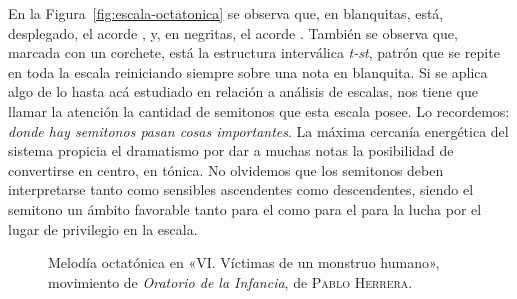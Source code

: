\documentclass[a4paper,10pt]{article}
\begin{document}
\begin{multicols}{2}
En la Figura~\ref{fig:escala-octatonica} se observa que, en blanquitas, está, desplegado, el acorde , y, en negritas, el acorde \hbox{.} También se observa que, marcada con un corchete, está la estructura interválica \emph{t-st}, patrón que se repite en toda la escala reiniciando siempre sobre una nota en blanquita. Si se aplica algo de lo hasta acá estudiado en relación a análisis de escalas, nos tiene que llamar la atención la cantidad de semitonos que esta escala posee. Lo recordemos: \emph{donde hay semitonos pasan cosas importantes}. La máxima cercanía energética del sistema propicia el dramatismo por dar a muchas notas la posibilidad de convertirse en centro, en tónica. No olvidemos que los semitonos deben interpretarse tanto como sensibles ascendentes como descendentes, siendo el semitono  un ámbito favorable tanto para el  como para el  para la lucha por el lugar de privilegio en la escala.
\end{multicols}

\begin{figure}[ht]
\centering
{}
\caption{Melodía octatónica en «VI. Víctimas de un monstruo humano», movimiento de \emph{Oratorio de la Infancia}, de \textsc{Pablo Herrera}.}\label{fig:melodia-octatonica}
\end{figure}
\end{document}
